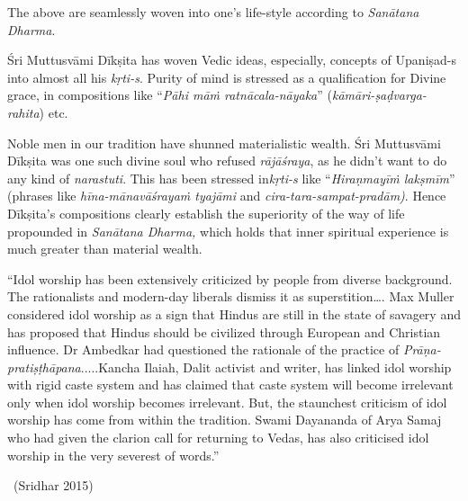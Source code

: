 \vspace{-.4cm}

The above are seamlessly woven into one’s life-style according to \textit{Sanātana Dharma}.

Śri Muttusvāmi Dīkṣita has woven Vedic ideas, especially, concepts of Upaniṣad-s into almost all his \textit{kṛti-s}. Purity of mind is stressed as a qualification for Divine grace, in compositions like “\textit{Pāhi māṁ ratnācala-nāyaka}” (\textit{kāmāri-ṣaḍvarga-rahita}) etc.

Noble men in our tradition have shunned materialistic wealth. Śri Muttusvāmi Dīkṣita was one such divine soul who refused \textit{rājāśraya}, as he didn’t want to do any kind of \textit{narastuti}. This has been stressed in\break \textit{kṛti-s} like “\textit{Hiraṇmayīṁ lakṣmīm}” (phrases like \textit{hīna-mānavāśrayaṁ tyajāmi} and \textit{cira-tara-sampat-pradām)}. Hence Dīkṣita’s compositions clearly establish the superiority of the way of life propounded in \textit{Sanātana Dharma,} which holds that inner spiritual experience is much greater than material wealth.

\begin{myquote}
“Idol worship has been extensively criticized by people from diverse background. The rationalists and modern-day liberals dismiss it as superstition…. Max Muller considered idol worship as a sign that Hindus are still in the state of savagery and has proposed that Hindus should be civilized through European and Christian influence. Dr Ambedkar had questioned the rationale of the practice of \textit{Prāṇa-pratiṣṭhāpana}.....Kancha Ilaiah, Dalit activist and writer, has linked idol worship with rigid caste system and has claimed that caste system will become irrelevant only when idol worship becomes irrelevant. But, the staunchest criticism of idol worship has come from within the tradition. Swami Dayananda of Arya Samaj who had given the clarion call for returning to Vedas, has also criticised idol worship in the very severest of words.” 

~\hfill (Sridhar 2015)
\end{myquote}


